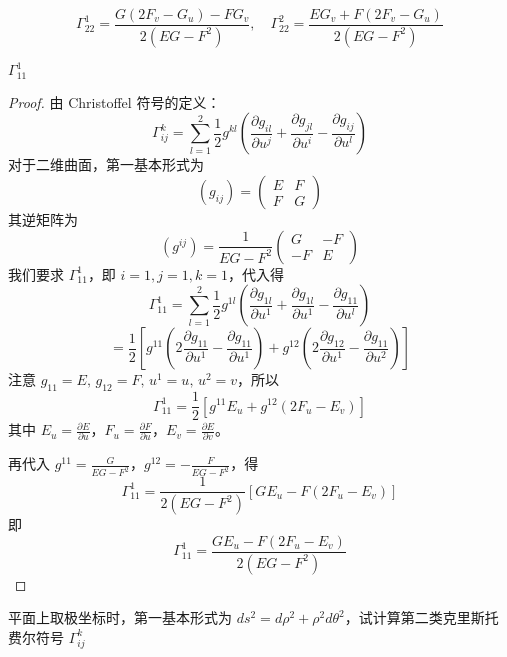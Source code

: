 \documentclass[lang=cn,10pt,thmcnt=section]{elegantbook}
\begin{document}
\[
\Gamma_{22}^1 = \frac{G(2F_v - G_u) - F G_v}{2(EG - F^2)}, \quad \Gamma_{22}^2 = \frac{E G_v + F(2F_v - G_u)}{2(EG - F^2)}
\]
\begin{example}
	$\Gamma_{11}^1 $
\end{example}
\begin{proof}
	由 Christoffel 符号的定义：
	\[
	\Gamma_{ij}^k = \sum_{l=1}^2 \frac{1}{2} g^{kl} \left( \frac{\partial g_{il}}{\partial u^j} + \frac{\partial g_{jl}}{\partial u^i} - \frac{\partial g_{ij}}{\partial u^l} \right)
	\]
	对于二维曲面，第一基本形式为
	\[
	(g_{ij}) = \begin{pmatrix}
	E & F \\
	F & G
	\end{pmatrix}
	\]
	其逆矩阵为
	\[
	(g^{ij}) = \frac{1}{EG - F^2}
	\begin{pmatrix}
	G & -F \\
	-F & E
	\end{pmatrix}
	\]
	我们要求 $\Gamma_{11}^1$，即 $i=1, j=1, k=1$，代入得
	\[
	\Gamma_{11}^1 = \sum_{l=1}^2 \frac{1}{2} g^{1l} \left( \frac{\partial g_{1l}}{\partial u^1} + \frac{\partial g_{1l}}{\partial u^1} - \frac{\partial g_{11}}{\partial u^l} \right)
	\]
	\[
	= \frac{1}{2} \left[
	g^{11} \left( 2\frac{\partial g_{11}}{\partial u^1} - \frac{\partial g_{11}}{\partial u^1} \right)
	+ g^{12} \left( 2\frac{\partial g_{12}}{\partial u^1} - \frac{\partial g_{11}}{\partial u^2} \right)
	\right]
	\]
	注意 $g_{11}=E,\,g_{12}=F,\,u^1=u,\,u^2=v$，所以
	\[
	\Gamma_{11}^1 = \frac{1}{2} \left[
	g^{11} E_u
	+ g^{12} (2F_u - E_v)
	\right]
	\]
	其中 $E_u = \frac{\partial E}{\partial u}$，$F_u = \frac{\partial F}{\partial u}$，$E_v = \frac{\partial E}{\partial v}$。
	
	再代入 $g^{11} = \frac{G}{EG-F^2}$，$g^{12} = -\frac{F}{EG-F^2}$，得
	\[
	\Gamma_{11}^1 = \frac{1}{2(EG-F^2)} \left[
	G E_u - F (2F_u - E_v)
	\right]
	\]
	即
	\[
	\boxed{
	\Gamma_{11}^1 = \frac{G E_u - F (2F_u - E_v)}{2(EG-F^2)}
	}
	\]
\end{proof}
\begin{example}
	平面上取极坐标时，第一基本形式为 $ds^2 = d\rho^2 + \rho^2 d\theta^2$，试计算第二类克里斯托费尔符号 $\Gamma_{ij}^k$
\end{example}
\end{document}

